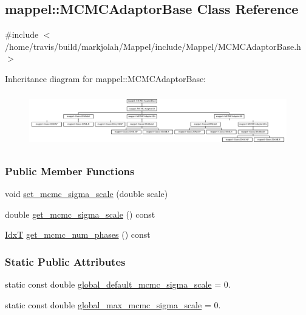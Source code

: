 \hypertarget{classmappel_1_1MCMCAdaptorBase}{}\subsection{mappel\+:\+:M\+C\+M\+C\+Adaptor\+Base Class Reference}
\label{classmappel_1_1MCMCAdaptorBase}


{\ttfamily \#include $<$/home/travis/build/markjolah/\+Mappel/include/\+Mappel/\+M\+C\+M\+C\+Adaptor\+Base.\+h$>$}

Inheritance diagram for mappel\+:\+:M\+C\+M\+C\+Adaptor\+Base\+:\begin{figure}[H]
\begin{center}
\leavevmode
\includegraphics[height=2.346369cm]{classmappel_1_1MCMCAdaptorBase}
\end{center}
\end{figure}
\subsubsection*{Public Member Functions}
\begin{DoxyCompactItemize}
\item 
void \hyperlink{classmappel_1_1MCMCAdaptorBase_aa6b8eea136bf1f34f0c50bf8d1937a58}{set\+\_\+mcmc\+\_\+sigma\+\_\+scale} (double scale)
\item 
double \hyperlink{classmappel_1_1MCMCAdaptorBase_a9de5ee52bbf5c8fd3c1e3bd00836801a}{get\+\_\+mcmc\+\_\+sigma\+\_\+scale} () const 
\item 
\hyperlink{namespacemappel_ab17ec0f30b61ece292439d7ece81d3a8}{IdxT} \hyperlink{classmappel_1_1MCMCAdaptorBase_adb9997f1dc774f3a169c61cdb730a85f}{get\+\_\+mcmc\+\_\+num\+\_\+phases} () const 
\end{DoxyCompactItemize}
\subsubsection*{Static Public Attributes}
\begin{DoxyCompactItemize}
\item 
static const double \hyperlink{classmappel_1_1MCMCAdaptorBase_a44cebca0e27135c854fa8430d2d89929}{global\+\_\+default\+\_\+mcmc\+\_\+sigma\+\_\+scale} = 0.
\item 
static const double \hyperlink{classmappel_1_1MCMCAdaptorBase_aebc93881ca351e67de867238a62579eb}{global\+\_\+max\+\_\+mcmc\+\_\+sigma\+\_\+scale} = 0.
\end{DoxyCompactItemize}

